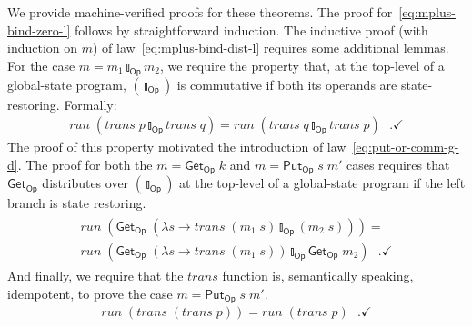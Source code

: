 \documentclass{jfp}
\newcommand{\Conid}[1]{\mathit{#1}}
\newcommand{\Varid}[1]{\mathit{#1}}
\let\Varid\mathit
\let\Conid\mathsf
\begin{document}
We provide machine-verified proofs for these theorems.
The proof for~\eqref{eq:mplus-bind-zero-l} follows by straightforward induction.
The inductive proof (with induction on \ensuremath{\Varid{m}}) of law~\eqref{eq:mplus-bind-dist-l}
requires some additional lemmas.
For the case \ensuremath{\Varid{m}\mathrel{=}\Varid{m}_{1}\mathbin{\talloblong}_\Conid{Op}\Varid{m}_{2}}, we require the property that, at the top-level
of a global-state program, \ensuremath{(\talloblong_\Conid{Op})} is commutative if both its operands are
state-restoring.
Formally:
\begin{align}
  \ensuremath{\Varid{run}\;(\Varid{trans}\;\Varid{p}\mathbin{\talloblong}_\Conid{Op}\Varid{trans}\;\Varid{q})} = \ensuremath{\Varid{run}\;(\Varid{trans}\;\Varid{q}\mathbin{\talloblong}_\Conid{Op}\Varid{trans}\;\Varid{p})}\mbox{~~.} \checkmark
\end{align}
The proof of this property motivated the introduction of
law~\eqref{eq:put-or-comm-g-d}.
The proof for both the \ensuremath{\Varid{m}\mathrel{=}\Conid{Get}_\Conid{Op}\;\Varid{k}} and \ensuremath{\Varid{m}\mathrel{=}\Conid{Put}_\Conid{Op}\;\Varid{s}\;\Varid{m'}} cases requires that \ensuremath{\Conid{Get}_\Conid{Op}}
distributes
over \ensuremath{(\talloblong_\Conid{Op})} at the top-level of a global-state program if the left branch is
state restoring.
\begin{align}
\begin{split}
\ensuremath{\Varid{run}\;(\Conid{Get}_\Conid{Op}\;(\lambda \Varid{s}\to \Varid{trans}\;(\Varid{m}_{1}\;\Varid{s})\mathbin{\talloblong}_\Conid{Op}(\Varid{m}_{2}\;\Varid{s})))} = \\
\ensuremath{\Varid{run}\;(\Conid{Get}_\Conid{Op}\;(\lambda \Varid{s}\to \Varid{trans}\;(\Varid{m}_{1}\;\Varid{s}))\mathbin{\talloblong}_\Conid{Op}\Conid{Get}_\Conid{Op}\;\Varid{m}_{2})} \label{eq:get-ret-mplus-g}\mbox{~~.} \checkmark
\end{split}
\end{align}
And finally, we require that the \ensuremath{\Varid{trans}} function is, semantically speaking,
idempotent, to prove the case \ensuremath{\Varid{m}\mathrel{=}\Conid{Put}_\Conid{Op}\;\Varid{s}\;\Varid{m'}}.
\begin{align}
\ensuremath{\Varid{run}\;(\Varid{trans}\;(\Varid{trans}\;\Varid{p}))\mathrel{=}\Varid{run}\;(\Varid{trans}\;\Varid{p})} \label{eq:run-trans-trans} \mbox{~~.} \checkmark
\end{align}
\end{document}
